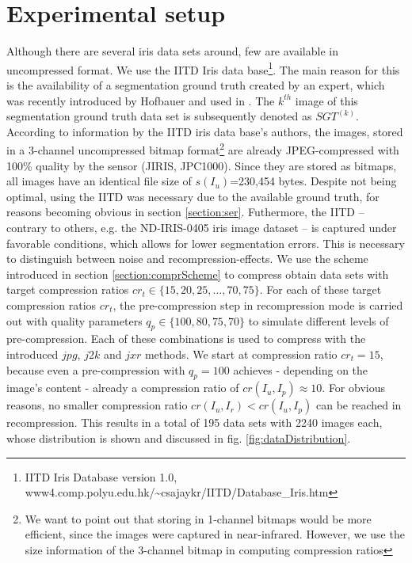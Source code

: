 \documentclass[10pt,twocolumn,letterpaper]{article}
\begin{document}
\section{Experimental setup}
\label{section:exSetup}
Although there are several iris data sets around, few are available in uncompressed format. We use the IITD Iris data base\footnote{IITD Iris Database version 1.0, www4.comp.polyu.edu.hk/\textasciitilde csajaykr/IITD/Database\_Iris.htm}. The main reason for this is the availability of a segmentation ground truth created by an expert, which was recently introduced by Hofbauer \etal \cite{Hofbauer14b} and used in \cite{severeCompression}. The $k^{th}$ image of this segmentation ground truth data set is subsequently denoted as $SGT^{(k)}$. 
According to information by the IITD iris data base's authors, the images, stored in a 3-channel uncompressed bitmap format\footnote{We want to point out that storing in 1-channel bitmaps would be more efficient, since the images were captured in near-infrared. However, we use the size information of the 3-channel bitmap in computing compression ratios} are already JPEG-compressed with 100\% quality by the sensor (JIRIS, JPC1000). Since they are stored as bitmaps, all images have an identical file size of $s(I_u)$=230,454 bytes. Despite not being optimal, using the IITD was necessary due to the available ground truth, for reasons becoming obvious in section \ref{section:ser}. Futhermore, the IITD -- contrary to others, e.g. the ND-IRIS-0405 iris image dataset \cite{Bowyer_thend-iris-0405} -- is captured under favorable conditions, which allows for lower segmentation errors. This is necessary to distinguish between noise and recompression-effects. We use the scheme introduced in section \ref{section:comprScheme} to compress obtain data sets with target compression ratios $cr_t \in \{15, 20, 25, ..., 70, 75\}$. For each of these target compression ratios $cr_t$, the pre-compression step in recompression mode is carried out with quality parameters $q_p \in \{100, 80, 75, 70\}$ to simulate different levels of pre-compression. Each of these combinations is used to compress with the introduced $jpg$, $j2k$ and $jxr$ methods. We start at compression ratio $cr_t=15$, because even a pre-compression with $q_p=100$ achieves - depending on the image's content - already a compression ratio of $cr(I_u, I_p) \approx 10$. For obvious reasons, no smaller compression ratio $cr(I_u, I_r) < cr(I_u, I_p)$ can be reached in recompression. This results in a total of 195 data sets with 2240 images each, whose distribution is shown and discussed in fig. \ref{fig:dataDistribution}.
\end{document}
